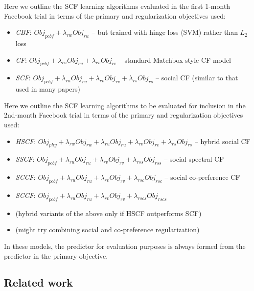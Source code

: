 \documentclass{sig-alternate}
\newcommand{\Obj}{\mathit{Obj}}
\newcommand{\pcbf}{\mathit{pcbf}}
\newcommand{\phy}{\mathit{phy}}
\newcommand{\ru}{\mathit{ru}}
\newcommand{\rv}{\mathit{rv}}
\newcommand{\rw}{\mathit{rw}}
\newcommand{\rs}{\mathit{rs}}
\newcommand{\rss}{\mathit{rss}}
\newcommand{\rsc}{\mathit{rsc}}
\newcommand{\rscs}{\mathit{rscs}}
\begin{document}
Here we outline the SCF learning algorithms evaluated in the first
1-month Facebook trial in terms of
the primary and regularization objectives used:
\begin{itemize}
\item {\it CBF}: $\Obj_\pcbf + \lambda_\rw \Obj_\rw$ -- but trained with hinge loss (SVM) rather than $L_2$ loss
\item {\it CF}: $\Obj_\pcbf + \lambda_\ru \Obj_\ru + \lambda_\rv \Obj_\rv$ -- standard Matchbox-style CF model
\item {\it SCF}: $\Obj_\pcbf + \lambda_\ru \Obj_\ru + \lambda_\rv \Obj_\rv + \lambda_\rs \Obj_\rs$ -- social CF (similar to that used in many papers)
\end{itemize}

Here we outline the SCF learning algorithms to be evaluated for inclusion
in the 2nd-month Facebook trial in terms of
the primary and regularization objectives used:
\begin{itemize}
\item {\it HSCF}: $\Obj_\phy + \lambda_\rw \Obj_\rw + \lambda_\ru \Obj_\ru + \lambda_\rv \Obj_\rv + \lambda_\rs \Obj_\rs$ -- hybrid social CF
\item {\it SSCF}: $\Obj_\pcbf + \lambda_\ru \Obj_\ru + \lambda_\rv \Obj_\rv + \lambda_\rss \Obj_\rss$ -- social spectral CF
\item {\it SCCF}: $\Obj_\pcbf + \lambda_\ru \Obj_\ru + \lambda_\rv \Obj_\rv + \lambda_\rsc \Obj_\rsc$ -- social co-preference CF
\item {\it SCCF}: $\Obj_\pcbf + \lambda_\ru \Obj_\ru + \lambda_\rv \Obj_\rv + \lambda_\rscs \Obj_\rscs$
\item (hybrid variants of the above only if HSCF outperforms SCF)
\item (might try combining social and co-preference regularization)
\end{itemize}
In these models, the predictor for evaluation purposes is always
formed from the predictor in the primary objective.

\subsection{Related work}
\end{document}

